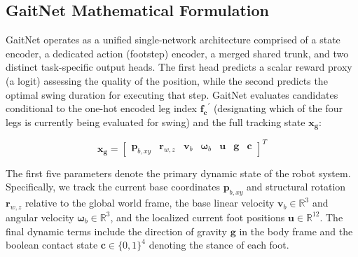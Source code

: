 \subsection{GaitNet Mathematical Formulation}
\label{subsec:methodology-gaitnet-architecture}

GaitNet operates as a unified single-network architecture comprised
of a state encoder,
a dedicated action (footstep) encoder, a merged shared trunk, and two
distinct task-specific
output heads. The first head predicts a scalar reward proxy (a logit)
assessing the quality
of the position, while the second predicts the optimal swing duration
for executing that step.
GaitNet evaluates candidates conditional to the one-hot encoded leg index
$\mathbf{f_c}^{\prime}$ (designating which of the four legs is
currently being evaluated for swing)
and the full tracking state $\mathbf{x_g}$:

\begin{equation}
  \mathbf{x_g} =
  \begin{bmatrix}
    \mathbf p_{b,xy} &
    \mathbf r_{w,z} &
    \mathbf v_b &
    \mathbf \omega_b &
    \mathbf u &
    \mathbf g &
    \mathbf c
  \end{bmatrix}^T
  \label{eq:gaitnet-x}
\end{equation}

The first five parameters denote the primary dynamic state of the
robot system. Specifically,
we track the current base coordinates $\mathbf{p}_{b,xy}$ and
structural rotation $\mathbf{r}_{w,z}$
relative to the global world frame, the base linear velocity
$\mathbf{v}_b \in \mathbb{R}^3$
and angular velocity $\mathbf{\omega}_b \in \mathbb{R}^3$, and the
localized current foot
positions $\mathbf u \in \mathbb{R}^{12}$. The final dynamic terms
include the direction of
gravity $\mathbf g$ in the body frame and the boolean contact state
$\mathbf c \in \{0, 1\}^4$
denoting the stance of each foot.

